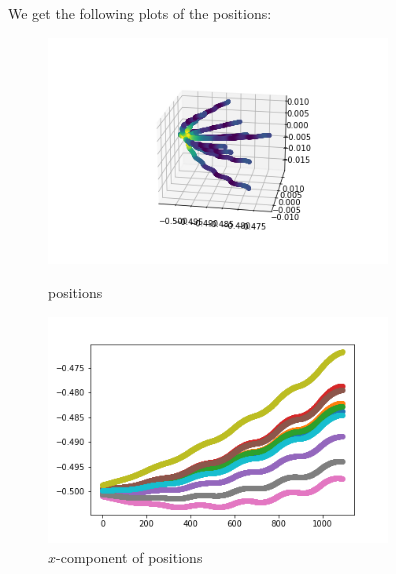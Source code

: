 \documentclass[12pt]{article}
\begin{document}
	We get the following plots of the positions:
	
	\begin{figure}[H]
		\begin{multicols}{2}
			\includegraphics[width=\linewidth, height=6cm]{multips1.png} \caption{positions} \label{multips1} \par
			\includegraphics[width=\linewidth, height=6cm]{multipsx1.png} \caption{$x$-component of positions} \label{multipsx1} \par
		\end{multicols}
	\end{figure}
\end{document}
